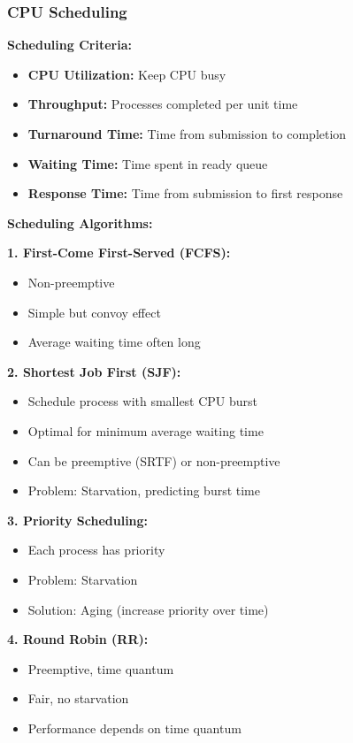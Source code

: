 \documentclass[11pt,a4paper]{article}
\begin{document}
\subsubsection{CPU Scheduling}

\textbf{Scheduling Criteria:}
\begin{itemize}
    \item \textbf{CPU Utilization:} Keep CPU busy
    \item \textbf{Throughput:} Processes completed per unit time
    \item \textbf{Turnaround Time:} Time from submission to completion
    \item \textbf{Waiting Time:} Time spent in ready queue
    \item \textbf{Response Time:} Time from submission to first response
\end{itemize}

\textbf{Scheduling Algorithms:}

\textbf{1. First-Come First-Served (FCFS):}
\begin{itemize}
    \item Non-preemptive
    \item Simple but convoy effect
    \item Average waiting time often long
\end{itemize}

\textbf{2. Shortest Job First (SJF):}
\begin{itemize}
    \item Schedule process with smallest CPU burst
    \item Optimal for minimum average waiting time
    \item Can be preemptive (SRTF) or non-preemptive
    \item Problem: Starvation, predicting burst time
\end{itemize}

\textbf{3. Priority Scheduling:}
\begin{itemize}
    \item Each process has priority
    \item Problem: Starvation
    \item Solution: Aging (increase priority over time)
\end{itemize}

\textbf{4. Round Robin (RR):}
\begin{itemize}
    \item Preemptive, time quantum
    \item Fair, no starvation
    \item Performance depends on time quantum
\end{itemize}
\end{document}
